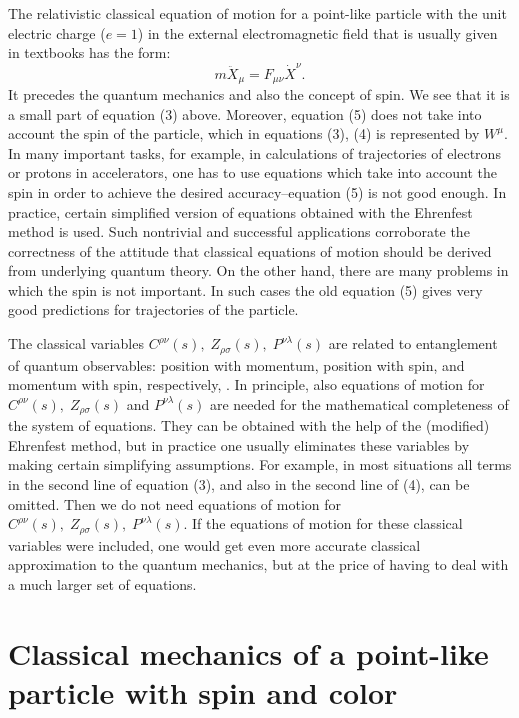 \documentclass[12pt]{article}
\begin{document}
The relativistic classical equation of motion for a point-like particle with the unit electric charge ($e=1$) in the external electromagnetic field that is usually given in textbooks has the form:
\begin{equation} m \ddot{X}_{\mu} = F_{\mu\nu}\dot{X}^{\nu}. \end{equation}
It precedes the quantum mechanics and also the concept of spin. We see that 
it is a small part of equation (3) above. Moreover, equation (5) does not take into account the spin of the particle, which in equations (3), (4) is represented by $W^{\mu}$. In many important tasks, for example, in calculations of trajectories of electrons or protons in accelerators, one has to use equations which take into account the spin in order to achieve the desired accuracy--equation (5) is not good enough. In practice, certain simplified version of equations obtained with the Ehrenfest method is used. Such nontrivial and successful applications corroborate the correctness of the attitude that classical equations of motion should be derived from underlying quantum theory. On the other hand, there are many problems in which the spin is not important. In such cases the old equation (5) gives very good predictions for trajectories of the particle. 






The classical variables $ C^{\rho\nu}(s), \;Z_{\rho\sigma}(s), \;P^{\nu\lambda}(s)$ are related to entanglement of quantum observables: position with momentum, position with spin, and momentum with spin, respectively, \cite{aro1}. In principle, also equations of motion for $ C^{\rho\nu}(s), \;Z_{\rho\sigma}(s)$ and $P^{\nu\lambda}(s)$ are needed for the mathematical completeness of the system of equations. They can be obtained with the help of the (modified) Ehrenfest method, but in practice one usually eliminates these variables by making certain simplifying assumptions. For example, in most situations all terms in the second line of equation (3), and also in the second line of (4), can be omitted. Then we do not need equations of motion for $ C^{\rho\nu}(s), \;Z_{\rho\sigma}(s), \;P^{\nu\lambda}(s)$. If the equations of motion for these classical variables were included, one would get even more accurate 
classical approximation to the quantum mechanics, but at the price of having to deal with a much larger set of equations. 



\section{ Classical mechanics of a point-like particle with spin and color }
\end{document}
